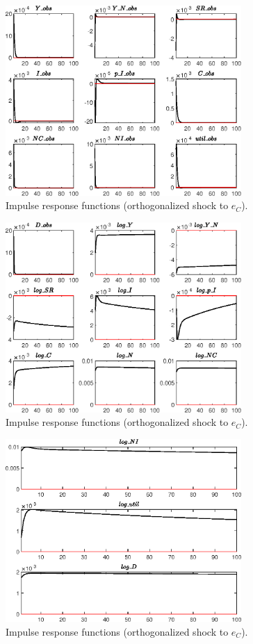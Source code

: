 \begin{figure}[H]
\centering 
\includegraphics[width=0.80\textwidth]{BRS_growth/graphs/BRS_growth_IRF_e_C1}
\caption{Impulse response functions (orthogonalized shock to ${e_C}$).}\label{Fig:IRF:e_C:1}
\end{figure}
 
\begin{figure}[H]
\centering 
\includegraphics[width=0.80\textwidth]{BRS_growth/graphs/BRS_growth_IRF_e_C2}
\caption{Impulse response functions (orthogonalized shock to ${e_C}$).}\label{Fig:IRF:e_C:2}
\end{figure}
 
\begin{figure}[H]
\centering 
\includegraphics[width=0.80\textwidth]{BRS_growth/graphs/BRS_growth_IRF_e_C3}
\caption{Impulse response functions (orthogonalized shock to ${e_C}$).}\label{Fig:IRF:e_C:3}
\end{figure}
 
 
